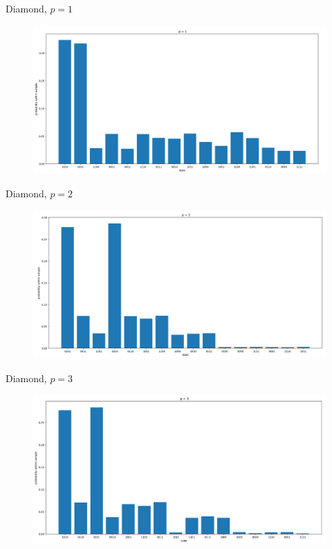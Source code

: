 \documentclass{beamer}
\begin{document}
\begin{frame}{Diamond, $p = 1$}
\begin{figure}
	\centering
	\includegraphics[scale=0.3,left]{figures/diamond-p1.png}
\end{figure}
\end{frame}

\begin{frame}{Diamond, $p = 2$}
\begin{figure}
\centering
\includegraphics[scale=0.3,left]{figures/diamond-p2.png}
\end{figure}
\end{frame}

\begin{frame}{Diamond, $p = 3$}
\begin{figure}
\centering
\includegraphics[scale=0.3,left]{figures/diamond-p3.png}
\end{figure}
\end{frame}
\end{document}
